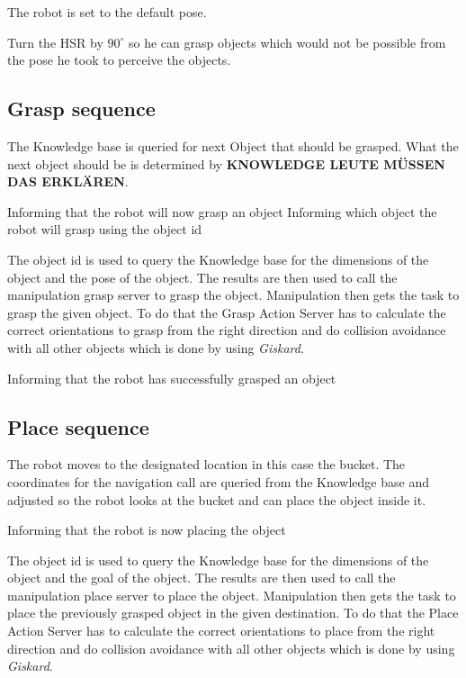 \documentclass[main.tex]{subfiles}
\begin{document}
	The robot is set to the default pose.
	
		
	Turn the HSR by $90^\circ$ so he can grasp objects which would not be possible from the pose he took to perceive the objects.
	
	\subsection{Grasp sequence}\label{clean_up_grasp_seq}
	
    The Knowledge base is queried for next Object that should be grasped.
	What the next object should be is determined by \textbf{KNOWLEDGE LEUTE MÜSSEN DAS ERKLÄREN}.	
	
	Informing that the robot will now grasp an object
	Informing which object the robot will grasp using the object id
	
	The object id is used to query the Knowledge base for the dimensions of the object and the pose of the object. The results are then used to call the manipulation grasp server to grasp the object. Manipulation then gets the task to grasp the given object. To do that the Grasp Action Server has to calculate the correct orientations to grasp from the right direction and do collision avoidance with all other objects which is done by using \textit{Giskard}.
	 
	Informing that the robot has successfully grasped an object
    
	\subsection{Place sequence}
	The robot moves to the designated location in this case the bucket.
	The coordinates for the navigation call are queried from the Knowledge base and adjusted so the robot looks at the bucket and can place the object inside it. 
	
	Informing that the robot is now placing the object

	The object id is used to query the Knowledge base for the dimensions of the object and the goal of the object. The results are then used to call the manipulation place server to place the object. Manipulation then gets the task to place the previously grasped object in the given destination. To do that the Place Action Server has to calculate the correct orientations to place from the right direction and do collision avoidance with all other objects which is done by using \textit{Giskard}.
	 
\end{document}
